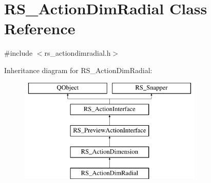 \hypertarget{classRS__ActionDimRadial}{\section{R\-S\-\_\-\-Action\-Dim\-Radial Class Reference}
\label{classRS__ActionDimRadial}
}


{\ttfamily \#include $<$rs\-\_\-actiondimradial.\-h$>$}

Inheritance diagram for R\-S\-\_\-\-Action\-Dim\-Radial\-:\begin{figure}[H]
\begin{center}
\leavevmode
\includegraphics[height=5.000000cm]{classRS__ActionDimRadial}
\end{center}
\end{figure}
